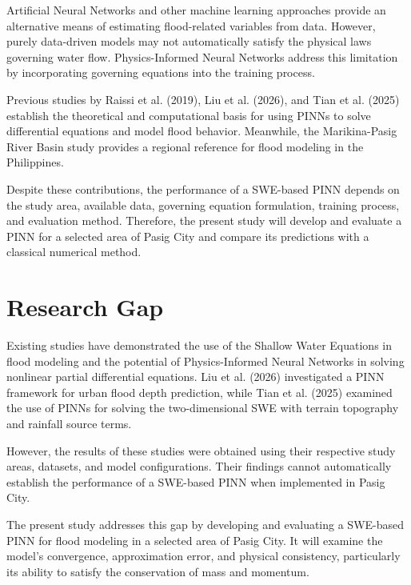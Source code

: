 Artificial Neural Networks and other machine learning approaches provide an alternative means of estimating flood-related variables from data. However, purely data-driven models may not automatically satisfy the physical laws governing water flow. Physics-Informed Neural Networks address this limitation by incorporating governing equations into the training process.

Previous studies by Raissi et al. (2019), Liu et al. (2026), and Tian et al. (2025) establish the theoretical and computational basis for using PINNs to solve differential equations and model flood behavior. Meanwhile, the Marikina-Pasig River Basin study provides a regional reference for flood modeling in the Philippines.

Despite these contributions, the performance of a SWE-based PINN depends on the study area, available data, governing equation formulation, training process, and evaluation method. Therefore, the present study will develop and evaluate a PINN for a selected area of Pasig City and compare its predictions with a classical numerical method.

\section{Research Gap}


Existing studies have demonstrated the use of the Shallow Water Equations in flood modeling and the potential of Physics-Informed Neural Networks in solving nonlinear partial differential equations. Liu et al. (2026) investigated a PINN framework for urban flood depth prediction, while Tian et al. (2025) examined the use of PINNs for solving the two-dimensional SWE with terrain topography and rainfall source terms.

However, the results of these studies were obtained using their respective study areas, datasets, and model configurations. Their findings cannot automatically establish the performance of a SWE-based PINN when implemented in Pasig City.

The present study addresses this gap by developing and evaluating a SWE-based PINN for flood modeling in a selected area of Pasig City. It will examine the model's convergence, approximation error, and physical consistency, particularly its ability to satisfy the conservation of mass and momentum.

